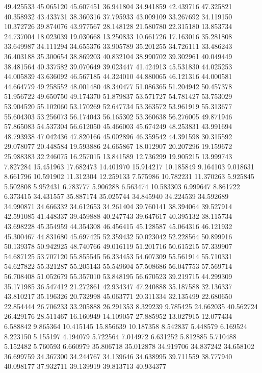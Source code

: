 49.425533
45.065120
45.607451
36.941804
34.941859
42.439716
47.325821
40.358932
43.433731
38.360316
37.795933
43.009109
33.267692
34.119150
10.372726
39.874076
43.977567
28.148128
21.580780
22.315180
13.853734
24.737004
18.023039
19.030668
13.250833
10.661726
17.163016
35.281808
33.649987
34.111294
34.655376
33.905789
35.201255
34.726111
33.486243
36.403188
35.300654
38.869203
40.832104
38.990702
39.302961
40.049449
38.481564
40.337582
39.070649
39.023447
41.424913
45.531830
44.025253
44.005839
43.636092
46.567185
44.324010
44.880065
46.121316
44.000581
44.664779
49.258552
48.001480
48.340477
51.086365
51.204942
50.457378
51.956722
49.650750
49.174370
51.879837
53.571727
54.781427
53.753029
53.904520
55.102060
53.170269
52.647734
53.363572
53.961919
55.313677
55.604303
53.256073
56.174043
56.165302
53.360638
56.276005
49.871946
57.865083
54.537304
56.612050
45.466003
45.674249
48.253831
43.991694
48.793938
47.042436
47.820166
45.002896
46.359542
44.391598
30.315592
29.078077
20.448584
19.593886
24.665867
18.012907
20.207296
19.159672
25.988383
32.246075
16.257015
13.841589
12.736299
19.905215
13.999743
7.827284
15.451963
17.682473
14.401970
15.914217
10.185849
9.164103
9.018631
8.661796
10.591902
11.312304
12.259133
7.575986
10.782231
11.370263
5.925845
5.502808
5.952431
6.783777
5.906288
6.563474
10.583303
6.999647
8.861722
6.373415
34.431557
35.887174
35.025744
34.845940
34.224539
34.592689
34.990871
34.666332
34.612653
34.261404
39.760141
38.394064
39.527914
42.591085
41.448337
39.459888
40.247743
39.647617
40.395132
38.115734
43.698228
45.354959
44.354308
46.456415
45.128587
45.064316
46.121932
45.300467
44.831680
45.697425
52.359432
50.023042
52.228564
50.899916
50.139378
50.942925
48.740766
49.016119
51.201716
50.615215
57.339907
54.687125
53.707120
55.855545
56.334453
54.607309
55.561914
55.710331
54.627822
55.321287
55.205143
55.549604
57.508686
56.047753
57.569714
56.708408
51.052679
55.357010
53.848195
56.670523
39.219715
44.299309
35.171985
36.547412
21.272861
42.934347
47.240888
35.187588
32.136337
43.810217
35.196326
20.732998
45.063771
20.311334
32.135499
22.680650
22.854444
26.706233
33.205888
26.291353
8.329239
9.785425
24.662035
40.562724
26.429176
28.511467
16.160949
14.109057
27.885952
13.027915
12.077434
6.588842
9.865364
10.415145
15.856639
10.187358
8.542837
5.448579
6.169524
8.223150
5.155197
4.194079
5.722564
7.014972
6.631252
5.812885
5.710488
5.152482
5.760593
6.660979
35.806718
35.012878
34.919706
34.837242
34.658102
36.699759
34.367300
34.244767
34.139646
34.638995
39.711559
38.777940
40.098177
37.932711
39.139919
39.813713
40.934377
